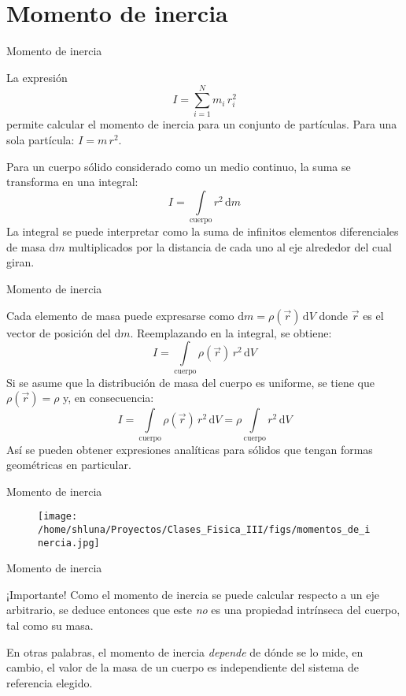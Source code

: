 \documentclass[11pt,handout,aspectratio=1610]{beamer}
\newcommand{\diff}[0]{\text{d}}
\newcommand{\vs}{\vspace{0.3cm}}
\begin{document}
\section{Momento de inercia}

\begin{frame}{Momento de inercia}

    La expresión $$I = \sum_{i=1}^N m_i \, r_i^2$$ permite calcular el momento de inercia para un conjunto de partículas. Para una sola partícula: $I = m \, r^2$.

    \vs

    Para un cuerpo sólido considerado como un medio continuo, la suma se transforma en una integral: $$ I = \int\limits_\text{cuerpo} r^2 \, \text{d}m$$ La integral se puede interpretar como la suma de infinitos elementos diferenciales de masa $\text{d}m$ multiplicados por la distancia de cada uno al eje alrededor del cual giran.

\end{frame}

\begin{frame}{Momento de inercia}

    Cada elemento de masa puede expresarse como $\diff{m} = \rho (\vec{r}) \, \diff{V}$ donde $\vec{r}$ es el vector de posición del $\diff{m}$. Reemplazando en la integral, se obtiene: $$ I = \int\limits_\text{cuerpo} \rho (\vec{r}) \, r^2 \, \text{d}V$$ Si se asume que la distribución de masa del cuerpo es uniforme, se tiene que $\rho (\vec{r}) = \rho$ y, en consecuencia: $$ I = \int\limits_\text{cuerpo} \rho (\vec{r}) \, r^2 \, \text{d}V = \rho \int\limits_\text{cuerpo} r^2 \, \text{d}V$$ Así se pueden obtener expresiones analíticas para sólidos que tengan formas geométricas en particular.

    
\end{frame}

\begin{frame}{Momento de inercia}
    
    \begin{figure}
        \centering
        \texttt{[image: /home/shluna/Proyectos/Clases\_Fisica\_III/figs/momentos\_de\_inercia.jpg]}
    \end{figure}

\end{frame}

\begin{frame}{Momento de inercia}
    
    \begin{alertblock}{¡Importante!}
        Como el momento de inercia se puede calcular respecto a un eje arbitrario, se deduce entonces que este \emph{no} es una propiedad intrínseca del cuerpo, tal como su masa. 

        \vspace{11pt}
        
        En otras palabras, el momento de inercia \emph{depende} de dónde se lo mide, en cambio, el valor de la masa de un cuerpo es independiente del sistema de referencia elegido. 
    \end{alertblock}

\end{frame}
\end{document}

